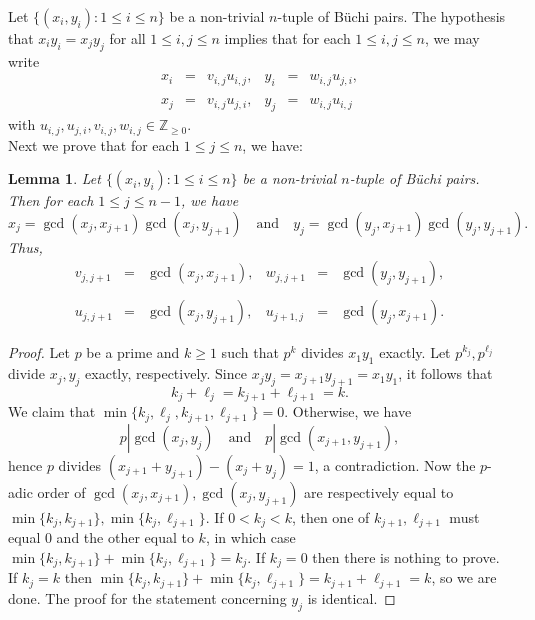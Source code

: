 \documentclass[letterpaper,10pt]{amsart}
\newcommand{\bZ}{{\mathbb{Z}}}
\newtheorem{lemma}[theorem]{Lemma}
\theoremstyle{definition}
\numberwithin{equation}{section}
\begin{document}
Let $\{(x_i, y_i) : 1 \leq i \leq n\}$ be a non-trivial $n$-tuple of B\"{u}chi pairs. The hypothesis that $x_i y_i = x_j y_j$ for all $1 \leq i, j \leq n$ implies that for each $1 \leq i, j \leq n$, we may write 
	\begin{equation} \label{gcddef}
	\begin{matrix} x_i & = & v_{i,j} u_{i,j}, & y_i  & = & w_{i,j} u_{j,i}, \\ \\
	x_j & = & v_{i,j} u_{j,i}, & y_j & = & w_{i,j} u_{i,j}
	\end{matrix}
	\end{equation}
with $u_{i,j}, u_{j,i}, v_{i,j}, w_{i,j} \in \bZ_{\geq 0}$. \\

Next we prove that for each $1 \leq j \leq n$, we have:
	
	\begin{lemma} \label{gcddecomp} Let $\{(x_i, y_i) : 1 \leq i \leq n\}$ be a non-trivial $n$-tuple of B\"{u}chi pairs. Then for each $1 \leq j \leq n-1$, we have 
	\[x_j = \gcd(x_j, x_{j+1}) \gcd(x_j, y_{j+1}) \quad \text{and} \quad y_j = \gcd(y_j, x_{j+1}) \gcd(y_j, y_{j+1}).\]
	Thus, 
	\[\begin{matrix} v_{j, j+1} & = & \gcd(x_j, x_{j+1}), & w_{j,j+1} &= & \gcd(y_j, y_{j+1}), \\ \\
	u_{j,j+1} & = & \gcd(x_j, y_{j+1}), & u_{j+1,j} & = & \gcd(y_j, x_{j+1}).
	\end{matrix}
	\]
	
	\end{lemma}
	
	\begin{proof} Let $p$ be a prime and $k \geq 1$ such that $p^k$ divides $x_1 y_1$ exactly. Let $p^{k_j}, p^{\ell_j}$ divide $x_j, y_j$ exactly, respectively. Since $x_j y_j = x_{j+1} y_{j+1} = x_1 y_1$, it follows that 
	\[k_j + \ell_j = k_{j+1} + \ell_{j+1} = k.\]
	We claim that $\min\{k_j, \ell_j, k_{j+1}, \ell_{j+1}\} = 0$. Otherwise, we have
	\[p | \gcd(x_j, y_j) \quad \text{and} \quad p | \gcd(x_{j+1}, y_{j+1}),\]
	hence $p$ divides $(x_{j+1} + y_{j+1}) - (x_j + y_j) = 1$, a contradiction. Now the $p$-adic order of $\gcd(x_j, x_{j+1}), \gcd(x_j, y_{j+1})$ are respectively equal to $\min\{k_j, k_{j+1}\}, \min\{k_j, \ell_{j+1}\}$. If $0 < k_j < k$, then one of $k_{j+1}, \ell_{j+1}$ must equal $0$ and the other equal to $k$, in which case $\min\{k_j, k_{j+1}\} + \min\{k_j, \ell_{j+1}\} = k_j$. If $k_j = 0$ then there is nothing to prove. If $k_j = k$ then $\min\{k_j, k_{j+1}\} + \min\{k_j, \ell_{j+1}\} = k_{j+1} + \ell_{j+1} = k$, so we are done. The proof for the statement concerning $y_j$ is identical. 
	\end{proof} 
	
\end{document}
